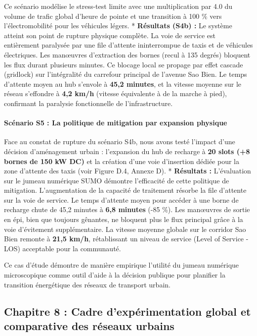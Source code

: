 \documentclass[10pt, a4paper]{article}
\begin{document}
Ce scénario modélise le stress-test limite avec une multiplication par
4.0 du volume de trafic global d'heure de pointe et une transition à 100
\% vers l'électromobilité pour les véhicules légers. * \textbf{Résultats
(S4b) :} Le système atteint son point de rupture physique complète. La
voie de service est entièrement paralysée par une file d'attente
ininterrompue de taxis et de véhicules électriques. Les manœuvres
d'extraction des bornes (recul à 135 degrés) bloquent les flux durant
plusieurs minutes. Ce blocage local se propage par effet cascade
(gridlock) sur l'intégralité du carrefour principal de l'avenue Sao
Bien. Le temps d'attente moyen au hub s'envole à \textbf{45,2 minutes},
et la vitesse moyenne sur le réseau s'effondre à \textbf{4,2 km/h}
(vitesse équivalente à de la marche à pied), confirmant la paralysie
fonctionnelle de l'infrastructure.

\paragraph{Scénario S5 : La politique de mitigation par expansion
physique}\label{scuxe9nario-s5-la-politique-de-mitigation-par-expansion-physique}

Face au constat de rupture du scénario S4b, nous avons testé l'impact
d'une décision d'aménagement urbain : l'expansion du hub de recharge à
\textbf{20 slots (+8 bornes de 150 kW DC)} et la création d'une voie
d'insertion dédiée pour la zone d'attente des taxis (voir Figure D.4,
Annexe D). * \textbf{Résultats :} L'évaluation sur le jumeau numérique
SUMO démontre l'efficacité de cette politique de mitigation.
L'augmentation de la capacité de traitement résorbe la file d'attente
sur la voie de service. Le temps d'attente moyen pour accéder à une
borne de recharge chute de 45,2 minutes à \textbf{6,8 minutes} (-85 \%).
Les manœuvres de sortie en épi, bien que toujours gênantes, ne bloquent
plus le flux principal grâce à la voie d'évitement supplémentaire. La
vitesse moyenne globale sur le corridor Sao Bien remonte à \textbf{21,5
km/h}, rétablissant un niveau de service (Level of Service - LOS)
acceptable pour la communauté.

Ce cas d'étude démontre de manière empirique l'utilité du jumeau
numérique microscopique comme outil d'aide à la décision publique pour
planifier la transition énergétique des réseaux de transport urbain.

\newpage

\subsection{Chapitre 8 : Cadre d'expérimentation global et comparative
des réseaux
urbains}\label{chapitre-8-cadre-dexpuxe9rimentation-global-et-comparative-des-ruxe9seaux-urbains}
\end{document}
